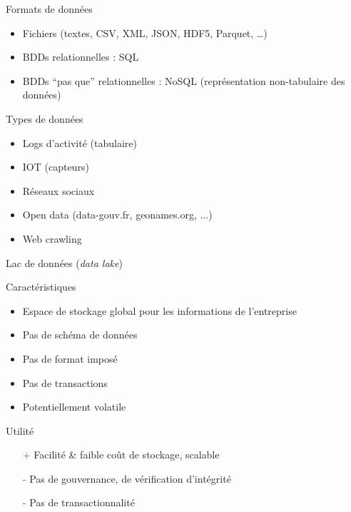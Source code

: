 
\begin{frame}{Formats de données}
  \begin{itemize}
    \item Fichiers (textes, CSV, XML, JSON, HDF5, Parquet, …)
    \item BDDs relationnelles : SQL
    \item BDDs ``pas que'' relationnelles : NoSQL (représentation non-tabulaire des données)
  \end{itemize}
\end{frame}

\begin{frame}{Types de données}
  \begin{itemize}
    \item Logs d'activité (tabulaire)
    \item IOT (capteurs)
    \item Réseaux sociaux
    \item Open data (data-gouv.fr, geonames.org, ...)
    \item Web crawling 
  \end{itemize}
\end{frame}

\begin{frame}{Lac de données (\textit{data lake})}

  Caractéristiques

  \begin{itemize}
    \item Espace de stockage global pour les informations de l'entreprise
    \item Pas de schéma de données
    \item Pas de format imposé
    \item Pas de transactions
    \item Potentiellement volatile
  \end{itemize}

  Utilité

  \begin{itemize}
    \item[\textcolor{green}{+}] Facilité \& faible coût de stockage, scalable
    \item[\textcolor{red}{-}] Pas de gouvernance, de vérification d'intégrité
    \item[\textcolor{red}{-}] Pas de transactionnalité
  \end{itemize}
\end{frame}

